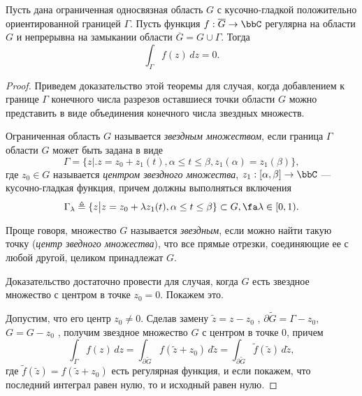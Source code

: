 \begin{thm}
Пусть дана ограниченная односвязная область $G$ с кусочно-гладкой положительно ориентированной границей $\Gamma$. Пусть функция $f:\overline{G}\to\bbC$ регулярна на области $G$ и непрерывна на замыкании области $\overline{G}=G\cup\Gamma$. Тогда
\begin{equation}
\label{abc10}
\int_{\Gamma} f(z)\,dz = 0.
\end{equation}
\end{thm}
\begin{proof}
Приведем доказательство этой теоремы для случая, когда добавлением к границе $\Gamma$ конечного числа разрезов оставшиеся точки области $G$ можно представить в виде объединения конечного числа звездных множеств. 
\begin{defn}
\label{abc8}
Ограниченная область $G$ называется \textit{звездным множеством}, если граница $\Gamma$ области $G$ может быть задана в виде
\begin{equation}
\label{abc5}
\Gamma = \{ z \bigr|\bigl. z = z_0+z_1(t), \alpha \le t \le \beta, z_1(\alpha) = z_1 (\beta) \},
\end{equation} 
где $z_0 \in G$ называется \textit{центром звездного множества}, $z_1 :[\alpha, \beta] \to \bbC$ --- кусочно-гладкая функция, причем должны выполняться включения
\begin{equation}
\label{abc7}
\Gamma_\lambda \triangleq \{ z \bigr|\bigl. z = z_0+\lambda z_1(t), \alpha \le t \le \beta\} \subset G, \fa \lambda \in [0,1).
\end{equation}

Проще говоря, множество $G$ называется \textit{звездным}, если можно найти такую точку (\textit{центр зведного множества}), что все прямые отрезки, соединяющие ее с любой другой, целиком принадлежат $G$.
\end{defn}

Доказательство достаточно провести для случая, когда $G$ есть звездное множество с центром в точке $z_0 = 0$. Покажем это. 

Допустим, что его центр $z_0 \ne 0$. Сделав  замену $\tilde z = z - z_0$ , $\partial\tilde G = \Gamma - z_0$, $G = G - z_0$ , получим звездное множество $G$ с центром в точке $0$, причем
$$
\int_{\Gamma} f(z)\,dz = \int_{\partial\tilde G} f(\tilde z +z_0)\,d\tilde z = \int_{\partial\tilde G} \tilde f(\tilde z)\,d\tilde z ,
$$
где $\tilde f(\tilde z) = f(\tilde z + z_0 )$ есть регулярная функция, и если покажем, что последний интеграл равен нулю, то и исходный равен нулю.


\end{proof}
